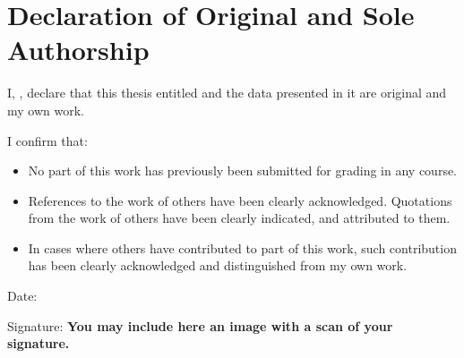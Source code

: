 \section*{Declaration of Original and Sole Authorship}

I, \name, declare that this thesis entitled \emph{\papertitle} and the data presented in it are original and my own work.


I confirm that:
\begin{itemize}
    \item No part of this work has previously been submitted for grading in any course.
    \item References to the work of others have been clearly acknowledged. Quotations from the work of others have been clearly indicated, and attributed to them.
    \item In cases where others have contributed to part of this work, such contribution has been clearly acknowledged and distinguished from my own work.
\end{itemize}

Date:  \submissiondate

Signature: \textbf{You may include here an image with a scan of your signature.}





